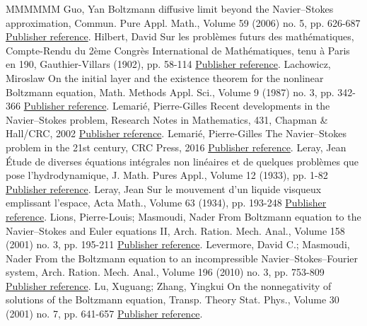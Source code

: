 \documentclass[11pt]{article}
\theoremstyle{definition}
\numberwithin{equation}{section}
\numberwithin{figure}{section}
\numberwithin{table}{section}
\begin{document}
\begin{thebibliography}{MMMMMM}
 Guo, Yan Boltzmann diffusive limit beyond the Navier–Stokes approximation, Commun. Pure Appl. Math., Volume 59 (2006) no. 5, pp. 626-687 \href{https://ahl.centre-mersenne.org/item/AHL_2020__3__561_0/#Guo}{Publisher reference}.
 Hilbert, David Sur les problèmes futurs des mathématiques, Compte-Rendu du 2ème Congrès International de Mathématiques, tenu à Paris en 190, Gauthier-Villars (1902), pp. 58-114 \href{https://ahl.centre-mersenne.org/item/AHL_2020__3__561_0/#Hilbert}{Publisher reference}.
 Lachowicz, Miroslaw On the initial layer and the existence theorem for the nonlinear Boltzmann equation, Math. Methods Appl. Sci., Volume 9 (1987) no. 3, pp. 342-366 \href{https://ahl.centre-mersenne.org/item/AHL_2020__3__561_0/#Lachowicz}{Publisher reference}.
 Lemarié, Pierre-Gilles Recent developments in the Navier–Stokes problem, Research Notes in Mathematics, 431, Chapman \& Hall/CRC, 2002 \href{https://ahl.centre-mersenne.org/item/AHL_2020__3__561_0/#lemarie1}{Publisher reference}.
 Lemarié, Pierre-Gilles The Navier–Stokes problem in the 21st century, CRC Press, 2016 \href{https://ahl.centre-mersenne.org/item/AHL_2020__3__561_0/#lemarie2}{Publisher reference}.
 Leray, Jean Étude de diverses équations intégrales non linéaires et de quelques problèmes que pose l’hydrodynamique, J. Math. Pures Appl., Volume 12 (1933), pp. 1-82 \href{https://ahl.centre-mersenne.org/item/AHL_2020__3__561_0/#leray2D}{Publisher reference}.
 Leray, Jean Sur le mouvement d’un liquide visqueux emplissant l’espace, Acta Math., Volume 63 (1934), pp. 193-248 \href{https://ahl.centre-mersenne.org/item/AHL_2020__3__561_0/#leray}{Publisher reference}.
 Lions, Pierre-Louis; Masmoudi, Nader From Boltzmann equation to the Navier–Stokes and Euler equations II, Arch. Ration. Mech. Anal., Volume 158 (2001) no. 3, pp. 195-211 \href{https://ahl.centre-mersenne.org/item/AHL_2020__3__561_0/#lionsmasmoudi}{Publisher reference}.
 Levermore, David C.; Masmoudi, Nader From the Boltzmann equation to an incompressible Navier–Stokes–Fourier system, Arch. Ration. Mech. Anal., Volume 196 (2010) no. 3, pp. 753-809 \href{https://ahl.centre-mersenne.org/item/AHL_2020__3__561_0/#Levermore-Masmoudi}{Publisher reference}.
 Lu, Xuguang; Zhang, Yingkui On the nonnegativity of solutions of the Boltzmann equation, Transp. Theory Stat. Phys., Volume 30 (2001) no. 7, pp. 641-657 \href{https://ahl.centre-mersenne.org/item/AHL_2020__3__561_0/#luzhang}{Publisher reference}.

\end{thebibliography}
\end{document}
